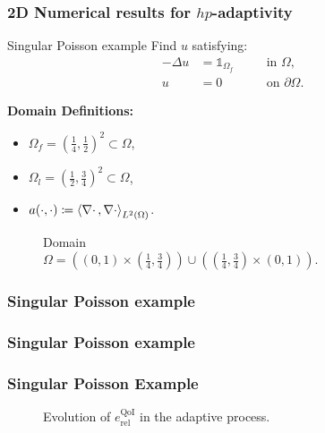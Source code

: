\begin{frame}
  \frametitle{2D Numerical results for $hp$-adaptivity}

  \begin{block}{Singular Poisson example}
    Find \(u\) satisfying:
    \begin{alignat}{2}
      - \Delta u & = \mathds{1}_{\Omega_{f}} && \quad \text{in } \Omega, \\
      u          & = 0                       && \quad \text{on } \partial \Omega.
    \end{alignat}
  \end{block}

  \begin{multicols}{2}
   \textbf{Domain Definitions:}
    \begin{itemize}
      \item \(\Omega_{f} = \left(\frac{1}{4},\frac{1}{2}\right)^{2} \subset \Omega\), 
      \item \(\Omega_{l} = \left(\frac{1}{2},\frac{3}{4}\right)^{2} \subset \Omega\),
      \item \(a(\cdot ,\cdot) \coloneqq \left<\nabla \cdot\,,\nabla \cdot\right>_{L^{2}(\Omega)}\).
    \end{itemize}
 
    \begin{figure}
       \centering
  	
      \caption{Domain \\ $\Omega = \left(\left(0,1\right) \times \left(\frac{1}{4},\frac{3}{4}\right)\right) \cup \left(\left(\frac{1}{4},\frac{3}{4}\right) \times \left(0,1\right)\right)$.}
    \end{figure}
  \end{multicols}

\end{frame}

\begin{frame}
	\frametitle{Singular Poisson example}
	\begin{figure}[t!]
	\end{figure}
\end{frame}

\begin{frame}
	\frametitle{Singular Poisson example}
\end{frame}

\begin{frame}
\frametitle{Singular Poisson Example}
\begin{figure}[t!]
\centering

\caption{Evolution of $e_{\textrm{rel}}^{\textrm{QoI}}$ in the adaptive process.}
\end{figure}
\end{frame}
